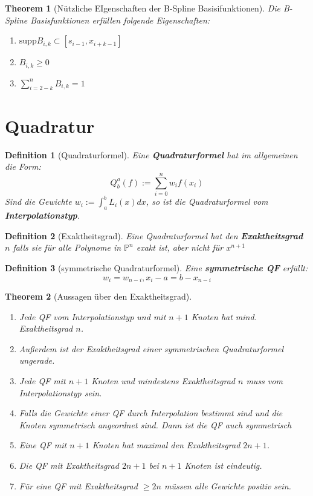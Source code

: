 \documentclass[10pt,a4paper]{article}
\newtheorem{theorem}{Theorem}
\newtheorem{definition}{Definition}
\begin{document}
	\begin{theorem}[Nützliche EIgenschaften der B-Spline Basisifunktionen]
		Die B-Spline Basisfunktionen erfüllen folgende Eigenschaften:
		\begin{enumerate}
			\item $\text{supp} B_{i, k} \subset [s_{i-1}, x_{i+k-1}]$
			\item $B_{i, k} \geq 0$
			\item $\sum_{i=2-k}^n B_{i, k} = 1$
		\end{enumerate}
	\end{theorem}
	\section{Quadratur}
	\begin{definition}[Quadraturformel]
		Eine \textbf{Quadraturformel} hat im allgemeinen die Form:
		$$Q^a_b(f) := \sum_{i=0}^{n}w_if(x_i)$$
		Sind die Gewichte $w_i := \int_a^bL_i(x)dx$, so ist die Quadraturformel vom \textbf{Interpolationstyp}.
	\end{definition}
	\begin{definition}[Exaktheitsgrad]
		Eine Quadraturformel hat den \textbf{Exaktheitsgrad} $n$ falls sie für alle Polynome in $\mathbb{P}^n$ exakt ist, aber nicht für $x^{n+1}$
	\end{definition}
	\begin{definition}[symmetrische Quadraturformel]
		Eine \textbf{symmetrische QF} erfüllt:
		$$w_i = w_{n-i}, x_i-a=b-x_{n-i}$$
	\end{definition}
	\begin{theorem}[Aussagen über den Exaktheitsgrad]
		\begin{enumerate}
			\item Jede QF vom Interpolationstyp und mit $n+1$ Knoten hat mind. Exaktheitsgrad $n$. 
			\item Außerdem ist der Exaktheitsgrad einer symmetrischen Quadraturformel ungerade.
			\item Jede QF mit $n+1$ Knoten und mindestens Exaktheitsgrad $n$ muss vom Interpolationstyp sein.
			\item Falls die Gewichte einer QF durch Interpolation bestimmt sind und die Knoten symmetrisch angeordnet sind. Dann ist die QF auch symmetrisch
			\item Eine QF mit $n+1$ Knoten hat maximal den Exaktheitsgrad $2n+1$.
			\item Die QF mit Exaktheitsgrad $2n+1$ bei $n+1$ Knoten ist eindeutig.
			\item Für eine QF mit Exaktheitsgrad $\geq 2n$ müssen alle Gewichte positiv sein.
		\end{enumerate}
	\end{theorem}
	
\end{document}
